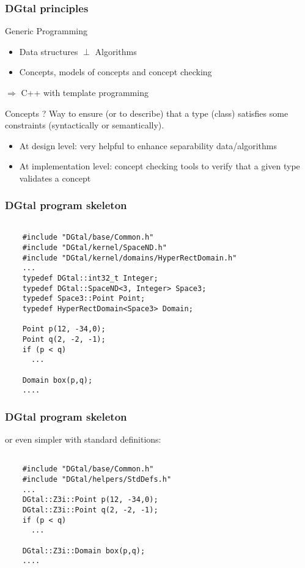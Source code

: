 \documentclass[8pt]{beamer}
\begin{document}
\begin{frame}
  \frametitle{DGtal principles}
\small
  \begin{block}{Generic Programming}
    \begin{itemize}
    \item Data structures $\perp$ Algorithms  
    \item Concepts, models of concepts and concept checking
    \end{itemize}
  \end{block}

\vspace{0.6cm}
\alert{$\Rightarrow$ C++  with template programming }
\small

\begin{exampleblock}{Concepts ?}
  Way to ensure (or to describe) that a type (class) satisfies some
  constraints (syntactically or semantically).
  \begin{itemize}
  \item At design level: very helpful to enhance separability
    data/algorithms
  \item At implementation level: concept checking tools to verify that
    a given type validates a concept
  \end{itemize}
\end{exampleblock}
\end{frame}

\begin{frame}[containsverbatim]
\frametitle{DGtal program skeleton}

  \begin{lstlisting}
    
    #include "DGtal/base/Common.h"
    #include "DGtal/kernel/SpaceND.h"
    #include "DGtal/kernel/domains/HyperRectDomain.h"
    ...
    typedef DGtal::int32_t Integer;
    typedef DGtal::SpaceND<3, Integer> Space3;
    typedef Space3::Point Point;
    typedef HyperRectDomain<Space3> Domain;
    
    Point p(12, -34,0);
    Point q(2, -2, -1);
    if (p < q)
      ...
    
    Domain box(p,q);
    ....

  \end{lstlisting}
\end{frame}


\begin{frame}[containsverbatim]
\frametitle{DGtal program skeleton}

or even simpler with standard definitions:

  \begin{lstlisting}
    
    #include "DGtal/base/Common.h"
    #include "DGtal/helpers/StdDefs.h"
    ...
    DGtal::Z3i::Point p(12, -34,0);
    DGtal::Z3i::Point q(2, -2, -1);
    if (p < q)
      ...
    
    DGtal::Z3i::Domain box(p,q);
    ....

  \end{lstlisting}
\end{frame}
\end{document}
